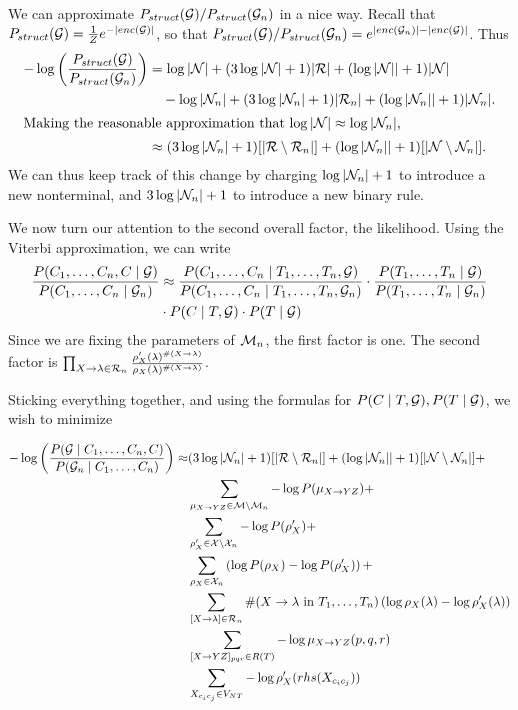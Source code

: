 \documentclass{article}
\begin{document}
We can approximate $P_{struct}({\mathcal G})/P_{struct}({\mathcal G}_n)$ in a nice
way. Recall that $P_{struct}({\mathcal G}) = \frac{1}{Z} e^{-|enc({\mathcal G})|}$, so
that $P_{struct}({\mathcal G})/P_{struct}({\mathcal G}_n) = e^{ |enc({\mathcal G}_n)| -
  |enc({\mathcal G})|}$. Thus
\begin{align*}
-\log\left(\frac{P_{struct}({\mathcal G})}{P_{struct}({\mathcal G}_n)}\right) &=
\log |{\mathcal N}| + (3 \log |{\mathcal N}| + 1)|{\mathcal R}| + (\log|{\mathcal N}|| + 1)|{\mathcal N}| \\ 
&\quad - \log |{\mathcal N}_n| + (3 \log |{\mathcal N}_n| + 1)|{\mathcal R}_n| + (\log|{\mathcal N}_n|| + 1)|{\mathcal N}_n|. \\ 
\intertext{Making the reasonable approximation that
$\log|{\mathcal N}| \approx \log |{\mathcal N}_n|$,}
&\approx (3 \log |{\mathcal N}_n| + 1)[|{\mathcal R} \setminus {\mathcal R}_n|] + 
(\log|{\mathcal N}_n|| + 1) [|{\mathcal N} \setminus {\mathcal N}_n|]. \\ 
\end{align*}
We can thus keep track of this change by charging $\log|{\mathcal N}_n|+1$ to
introduce a new nonterminal, and $3\log|{\mathcal N}_n|+1$ to introduce a new
binary rule.

We now turn our attention to the second overall factor, the
likelihood.  Using the Viterbi approximation, we can write
\begin{align*}
\frac{P(C_1,\dots,C_n, C\mid {\mathcal G})}{P(C_1,\dots,C_n \mid {\mathcal G}_n)}
& \approx
\frac{P(C_1,\dots,C_n \mid T_1,\dots, T_n, {\mathcal G})}{P(C_1,\dots,C_n \mid T_1,\dots, T_n, {\mathcal G}_n)}
\cdot
\frac{P(T_1,\dots,T_n \mid  {\mathcal G})}{P(T_1,\dots,T_n \mid  {\mathcal G}_n)} \\
& 
\cdot
P(C\mid T, {\mathcal G})
\cdot
P(T\mid {\mathcal G})
\end{align*}
Since we are fixing the parameters of ${\mathcal M}_n$, the first factor is
one. The second factor is $\prod_{X\to \lambda\in {\mathcal R}_n}
\frac{\rho'_X(\lambda)^{\#(X\to \lambda)}}{\rho_X(\lambda)^{\#(X\to
    \lambda)}}$.

Sticking everything together, and using the formulas for $P(C\mid T,
{\mathcal G}), P(T\mid {\mathcal G})$, we wish to minimize

\begin{align*}
-\log\left(
\frac{P({\mathcal G} \mid C_1, \dots, C_n, C)}{P({\mathcal G}_n\mid C_1, \dots, C_n)}
\right) 
\approx&
(3 \log |{\mathcal N}_n| + 1)[|{\mathcal R} \setminus {\mathcal R}_n|] + 
(\log|{\mathcal N}_n|| + 1) [|{\mathcal N} \setminus {\mathcal N}_n|] + \\
& \sum_{\mu_{X\to YZ}\in {\mathcal M}\setminus {\mathcal M}_n} -\log P(\mu_{X\to YZ}) +\\
& \sum_{\rho'_X\in {\mathcal X} \setminus {\mathcal X}_n} -\log P(\rho'_X) +\\
& \sum_{\rho_X \in {\mathcal X}_n} \left(\log P(\rho_X) -\log P(\rho'_X)\right) + \\
& \sum_{[X\to \lambda]\in {\mathcal R}_n} \#(X\to \lambda\text{ in } T_1,\dots,T_n)
\left( \log \rho_X(\lambda) - \log \rho'_X(\lambda) \right) \\
& \sum_{[X\to YZ]_{pqr}\in R(T)} -\log \mu_{X\to YZ}(p,q,r) \\
& \sum_{X_{c_i c_j}\in V_{NT}} -\log\rho'_{X}(rhs(X_{c_i c_j}))
\end{align*}
\end{document}
